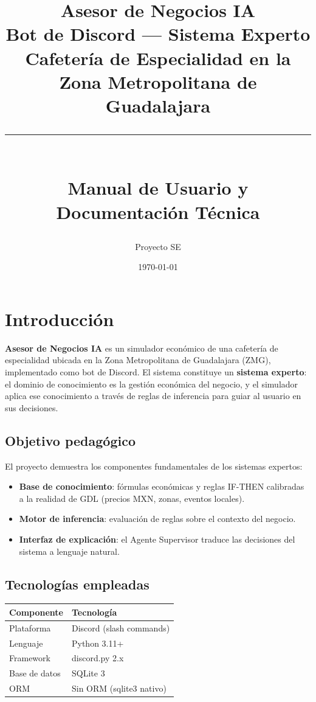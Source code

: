 \documentclass[12pt, a4paper]{article}
\title{
  \vspace{-1cm}
  {\Large\bfseries Asesor de Negocios IA}\\[0.4em]
  {\large Bot de Discord — Sistema Experto}\\[0.3em]
  {\normalsize Cafetería de Especialidad en la Zona Metropolitana de Guadalajara}\\[1em]
  \rule{\linewidth}{0.5pt}\\[0.5em]
  {\normalsize Manual de Usuario y Documentación Técnica}
}
\author{Proyecto SE}
\date{\today}
\begin{document}
\maketitle
\tableofcontents
\newpage

\section{Introducción}

\textbf{Asesor de Negocios IA} es un simulador económico de una cafetería de especialidad
ubicada en la Zona Metropolitana de Guadalajara (ZMG), implementado como bot de Discord.
El sistema constituye un \textbf{sistema experto}: el dominio de conocimiento es la gestión
económica del negocio, y el simulador aplica ese conocimiento a través de reglas de inferencia
para guiar al usuario en sus decisiones.

\subsection{Objetivo pedagógico}

El proyecto demuestra los componentes fundamentales de los sistemas expertos:
\begin{itemize}
  \item \textbf{Base de conocimiento}: fórmulas económicas y reglas IF-THEN calibradas
        a la realidad de GDL (precios MXN, zonas, eventos locales).
  \item \textbf{Motor de inferencia}: evaluación de reglas sobre el contexto del negocio.
  \item \textbf{Interfaz de explicación}: el Agente Supervisor traduce las decisiones
        del sistema a lenguaje natural.
\end{itemize}

\subsection{Tecnologías empleadas}

\begin{center}
\begin{tabular}{ll}
  \toprule
  Componente & Tecnología \\
  \midrule
  Plataforma & Discord (slash commands) \\
  Lenguaje   & Python 3.11+ \\
  Framework  & discord.py 2.x \\
  Base de datos & SQLite 3 \\
  ORM        & Sin ORM (sqlite3 nativo) \\
  \bottomrule
\end{tabular}
\end{center}
\end{document}
